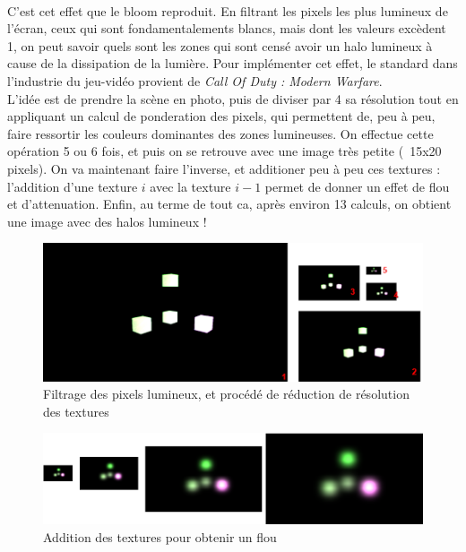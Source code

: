 \documentclass{EPUProjetDi}
\begin{document}
\paragraph{}
C'est cet effet que le bloom reproduit. En filtrant les pixels les plus lumineux de l'écran, ceux qui sont fondamentalements blancs, mais dont les valeurs excèdent 1, on peut savoir quels sont les zones qui sont censé avoir un halo lumineux à cause de la dissipation de la lumière.
Pour implémenter cet effet, le standard dans l'industrie du jeu-vidéo provient de \textit{Call Of Duty : Modern Warfare}\cite{bloom}.\\
L'idée est de prendre la scène en photo, puis de diviser par 4 sa résolution tout en appliquant un calcul de ponderation des pixels, qui permettent de, peu à peu, faire ressortir les couleurs dominantes des zones lumineuses.
On effectue cette opération 5 ou 6 fois, et puis on se retrouve avec une image très petite (~15x20 pixels). On va maintenant faire l'inverse, et additioner peu à peu ces textures : l'addition d'une texture $i$ avec la texture $i-1$ permet de donner un effet de flou et d'attenuation.
Enfin, au terme de tout ca, après environ 13 calculs, on obtient une image avec des halos lumineux !

\begin{figure}[ht]
	\centering
	\includegraphics[scale=.5]{down_samples}
	\caption{Filtrage des pixels lumineux, et procédé de réduction de résolution des textures}
	\label{fig:bloom_down_sample}
\end{figure}

\begin{figure}[ht]
	\centering
	\includegraphics[scale=.7]{up_samples}
	\caption{Addition des textures pour obtenir un flou}
	\label{fig:bloom_up_sample}
\end{figure}
\end{document}
